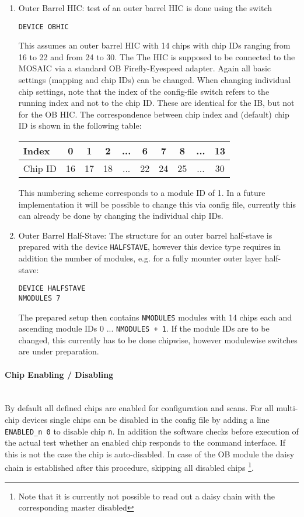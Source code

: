 \documentclass{article}
\begin{document}
\begin {enumerate}
\item Outer Barrel HIC: test of an outer barrel HIC is done using the switch
\begin{verbatim}
DEVICE OBHIC
\end{verbatim}
This assumes an outer barrel HIC with 14 chips with chip IDs ranging from 16 to 22 and from 24 to 30. The The HIC is supposed to be connected to the MOSAIC via a standard OB Firefly-Eyespeed adapter. Again all basic settings (mapping and chip IDs) can be changed. When changing individual chip settings, note that the index of the config-file switch refers to the running index and not to the chip ID. These are identical for the IB, but not for the OB HIC. The correspondence between chip index and (default) chip ID is shown in the following table:
\begin{center}
\begin{tabular}{|l|c|c|c|c|c|c|c|c|c|}\hline
Index & 0 & 1 & 2 & ... & 6 & 7 & 8 & ... & 13\\ \hline
Chip ID & 16 & 17 & 18 & ... & 22 & 24 & 25 & ... & 30\\ \hline
\end{tabular}
\end{center}
This numbering scheme corresponds to a module ID of 1. In a future implementation it will be possible to change this via config file, currently this can already be done by changing the individual chip IDs.

\item Outer Barrel Half-Stave: The structure for an outer barrel half-stave is prepared with the device \texttt{HALFSTAVE}, however this device type requires in addition the number of modules, e.g. for a fully mounter outer layer half-stave:
\begin{verbatim}
DEVICE HALFSTAVE
NMODULES 7
\end{verbatim}
The prepared setup then contains \texttt{NMODULES} modules with 14 chips each and ascending module IDs 0 ... \texttt{NMODULES + 1}. If the module IDs are to be changed, this currently has to be done chipwise, however modulewise switches are under preparation.

\end{enumerate}



\paragraph {Chip Enabling / Disabling} \hfill \\
By default all defined chips are enabled for configuration and scans. For all multi-chip devices single chips can be disabled in the config file by adding a line \texttt{ENABLED\_n 0} to disable chip \texttt{n}. In addition the software checks before execution of the actual test whether an enabled chip responds to the command interface. If this is not the case the chip is auto-disabled. In case of the OB module the daisy chain is established after this procedure, skipping all disabled chips \footnote{Note that it is currently not possible to read out a daisy chain with the corresponding master disabled}.
\end{document}

